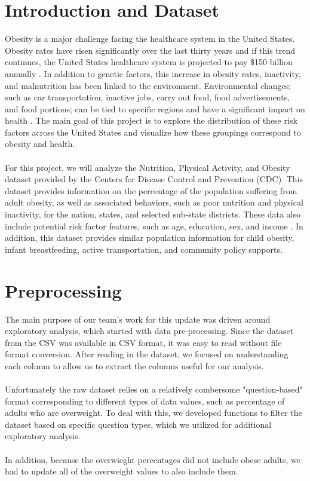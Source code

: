 \documentclass{article}
\begin{document}
	\section{Introduction and Dataset}
		\label{introduction}
		
		Obesity is a major challenge facing the healthcare system in the United States. Obesity rates have risen significantly over the last thirty years and if this trend continues, the United States healthcare system is projected to pay \$150 billion annually \cite{hurt2010obesity}.
		In addition to genetic factors, this increase in obesity rates, inactivity, and malnutrition has been linked to the environment. 
		Environmental changes; such as car transportation, inactive jobs, carry out food, food advertisements, and food portions; can be tied to specific regions and have a significant impact on health \cite{whyobesityhealthproblem, understandingadultoverweight}. 
		The main goal of this project is to explore the distribution of these risk factors across the United States and visualize how these groupings correspond to obesity and health.
		\\\\
		For this project, we will analyze the Nutrition, Physical Activity, and Obesity dataset provided by the Centers for Disease Control and Prevention (CDC).
		This dataset provides information on the percentage of the population suffering from adult obesity, as well as associated behaviors, such as poor nutrition and physical inactivity, for the nation, states, and selected sub-state districts. 
		These data also include potential risk factor features, such as age, education, sex, and income \cite{nutphysactobesitydata}.
		In addition, this dataset provides similar population information for child obesity, infant breastfeeding, active transportation, and community policy supports.
		
	\section{Preprocessing}
		\label{preprocessing}
		The main purpose of our team's work for this update was driven around exploratory analysis, which started with data pre-processing. Since the dataset from the CSV was available in CSV format, it was easy to read without file format conversion. After reading in the dataset, we focused on understanding each column to allow us to extract the columns useful for our analysis. 
		\\\\
		Unfortunately the raw dataset relies on a relatively combersome "question-based" format corresponding to different types of data values, such as percentage of adults who are overweight. To deal with this, we developed functions to filter the dataset based on specific question types, which we utilized for additional exploratory analysis.
		\\\\ 
		In addition, because the overwieght percentages did not include obese adults, we had to update all of the overweight values to also include them.
		
\end{document}
